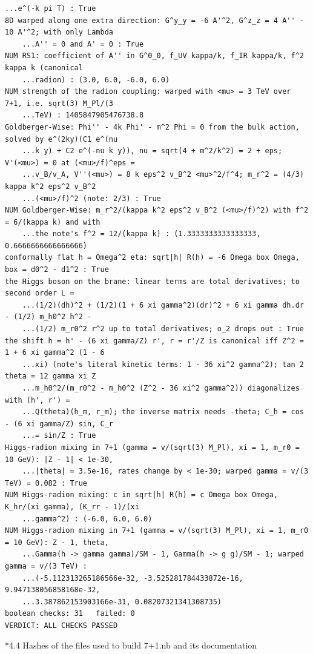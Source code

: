 \documentclass[10pt,a4paper]{article}
\makeatletter
\renewcommand\subsection{\@startsection{subsection}{2}{\z@}{-3.25ex\@plus -1ex \@minus -.2ex}{1.5ex \@plus .2ex}{\normalfont\large\bfseries\raggedright}}
\makeatother
\begin{document}
\begin{Verbatim}[fontsize=\small,frame=single,framesep=2mm]
    ...e^(-k pi T) : True
8D warped along one extra direction: G^y_y = -6 A'^2, G^z_z = 4 A'' - 10 A'^2; with only Lambda
    ...A'' = 0 and A' = 0 : True
NUM RS1: coefficient of A'' in G^0_0, f_UV kappa/k, f_IR kappa/k, f^2 kappa k (canonical
    ...radion) : (3.0, 6.0, -6.0, 6.0)
NUM strength of the radion coupling: warped with <mu> = 3 TeV over 7+1, i.e. sqrt(3) M_Pl/(3
    ...TeV) : 1405847905476738.8
Goldberger-Wise: Phi'' - 4k Phi' - m^2 Phi = 0 from the bulk action, solved by e^(2ky)(C1 e^(nu
    ...k y) + C2 e^(-nu k y)), nu = sqrt(4 + m^2/k^2) = 2 + eps; V'(<mu>) = 0 at (<mu>/f)^eps =
    ...v_B/v_A, V''(<mu>) = 8 k eps^2 v_B^2 <mu>^2/f^4; m_r^2 = (4/3) kappa k^2 eps^2 v_B^2
    ...(<mu>/f)^2 (note: 2/3) : True
NUM Goldberger-Wise: m_r^2/(kappa k^2 eps^2 v_B^2 (<mu>/f)^2) with f^2 = 6/(kappa k) and with
    ...the note's f^2 = 12/(kappa k) : (1.3333333333333333, 0.6666666666666666)
conformally flat h = Omega^2 eta: sqrt|h| R(h) = -6 Omega box Omega, box = d0^2 - d1^2 : True
the Higgs boson on the brane: linear terms are total derivatives; to second order L =
    ...(1/2)(dh)^2 + (1/2)(1 + 6 xi gamma^2)(dr)^2 + 6 xi gamma dh.dr - (1/2) m_h0^2 h^2 -
    ...(1/2) m_r0^2 r^2 up to total derivatives; o_2 drops out : True
the shift h = h' - (6 xi gamma/Z) r', r = r'/Z is canonical iff Z^2 = 1 + 6 xi gamma^2 (1 - 6
    ...xi) (note's literal kinetic terms: 1 - 36 xi^2 gamma^2); tan 2 theta = 12 gamma xi Z
    ...m_h0^2/(m_r0^2 - m_h0^2 (Z^2 - 36 xi^2 gamma^2)) diagonalizes with (h', r') =
    ...Q(theta)(h_m, r_m); the inverse matrix needs -theta; C_h = cos - (6 xi gamma/Z) sin, C_r
    ...= sin/Z : True
Higgs-radion mixing in 7+1 (gamma = v/(sqrt(3) M_Pl), xi = 1, m_r0 = 10 GeV): |Z - 1| < 1e-30,
    ...|theta| = 3.5e-16, rates change by < 1e-30; warped gamma = v/(3 TeV) = 0.082 : True
NUM Higgs-radion mixing: c in sqrt|h| R(h) = c Omega box Omega, K_hr/(xi gamma), (K_rr - 1)/(xi
    ...gamma^2) : (-6.0, 6.0, 6.0)
NUM Higgs-radion mixing in 7+1 (gamma = v/(sqrt(3) M_Pl), xi = 1, m_r0 = 10 GeV): Z - 1, theta,
    ...Gamma(h -> gamma gamma)/SM - 1, Gamma(h -> g g)/SM - 1; warped gamma = v/(3 TeV) :
    ...(-5.112313265186566e-32, -3.525281784433872e-16, 9.947138056858168e-32,
    ...3.387862153903166e-31, 0.08207321341308735)
boolean checks: 31   failed: 0
VERDICT: ALL CHECKS PASSED
\end{Verbatim}
\subsection*{4.4 Hashes of the files used to build 7+1.nb and its documentation}
\end{document}
